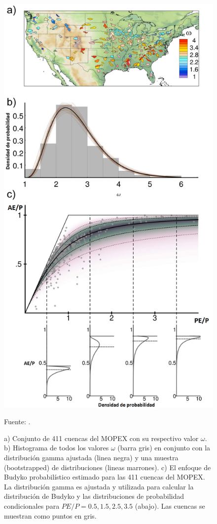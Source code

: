 \begin{figure}[ht]
\centering
	\includegraphics[scale=0.30]{Images/Greve03.png}
	\caption{a) Conjunto de 411 cuencas del MOPEX con su respectivo valor $\omega$. b) Histograma de todos los valores $\omega$ (barra gris) en conjunto con la distribución gamma ajustada (linea negra) y una muestra (bootstrapped) de distribuciones (lineas marrones). c) El enfoque de Budyko probabilístico estimado para las 411 cuencas del MOPEX. La distribución gamma es ajustada y utilizada para calcular la distribución de Budyko y las distribuciones de probabilidad condicionales para $PE/P = 0.5, 1.5, 2.5, 3.5$ (abajo). Las cuencas se muestran como puntos en gris.}
	Fuente: \citet{Greve2015}.
	\label{fig:Greve03}
\end{figure}
